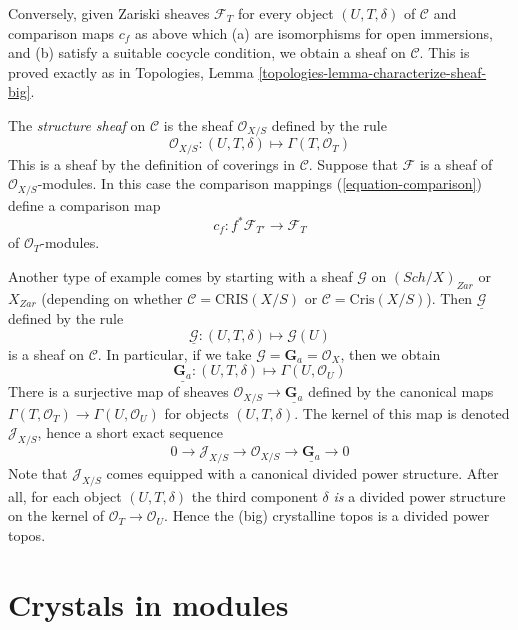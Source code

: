 \documentclass{stacks-project}
\theoremstyle{plain}
\theoremstyle{definition}
\theoremstyle{remark}
\numberwithin{equation}{subsection}
\def\Sch{\mathit{Sch}}
\begin{document}
\medskip\noindent
Conversely, given Zariski sheaves $\mathcal{F}_T$ for every object
$(U, T, \delta)$ of $\mathcal{C}$ and comparison maps
$c_f$ as above which (a) are isomorphisms for open immersions, and (b)
satisfy a suitable cocycle condition, we obtain a sheaf on
$\mathcal{C}$. This is proved exactly as in
Topologies, Lemma \ref{topologies-lemma-characterize-sheaf-big}.

\medskip\noindent
The {\it structure sheaf} on $\mathcal{C}$ is the sheaf
$\mathcal{O}_{X/S}$ defined by the rule
$$
\mathcal{O}_{X/S} :
(U, T, \delta)
\longmapsto
\Gamma(T, \mathcal{O}_T)
$$
This is a sheaf by the definition of coverings in $\mathcal{C}$.
Suppose that $\mathcal{F}$ is a sheaf of $\mathcal{O}_{X/S}$-modules.
In this case the comparison mappings (\ref{equation-comparison})
define a comparison map
\begin{equation}
\label{equation-comparison-modules}
c_f : f^*\mathcal{F}_{T'} \longrightarrow \mathcal{F}_T
\end{equation}
of $\mathcal{O}_T$-modules.

\medskip\noindent
Another type of example comes by starting with a sheaf
$\mathcal{G}$ on $(\Sch/X)_{Zar}$ or $X_{Zar}$ (depending on whether
$\mathcal{C} = \text{CRIS}(X/S)$ or $\mathcal{C} = \text{Cris}(X/S)$).
Then $\underline{\mathcal{G}}$ defined by the rule
$$
\underline{\mathcal{G}} :
(U, T, \delta)
\longmapsto
\mathcal{G}(U)
$$
is a sheaf on $\mathcal{C}$. In particular, if we take
$\mathcal{G} = \mathbf{G}_a = \mathcal{O}_X$, then we obtain
$$
\underline{\mathbf{G}_a} :
(U, T, \delta)
\longmapsto
\Gamma(U, \mathcal{O}_U)
$$
There is a surjective map of sheaves
$\mathcal{O}_{X/S} \to \underline{\mathbf{G}_a}$ defined by the
canonical maps $\Gamma(T, \mathcal{O}_T) \to \Gamma(U, \mathcal{O}_U)$
for objects $(U, T, \delta)$. The kernel of this map is denoted
$\mathcal{J}_{X/S}$, hence a short exact sequence
$$
0 \to
\mathcal{J}_{X/S} \to
\mathcal{O}_{X/S} \to
\underline{\mathbf{G}_a} \to 0
$$
Note that $\mathcal{J}_{X/S}$ comes equipped with a canonical
divided power structure. After all, for each object $(U, T, \delta)$
the third component $\delta$ {\it is} a divided power structure on the
kernel of $\mathcal{O}_T \to \mathcal{O}_U$. Hence the (big)
crystalline topos is a divided power topos.





\section{Crystals in modules}
\label{section-crystals}
\end{document}
